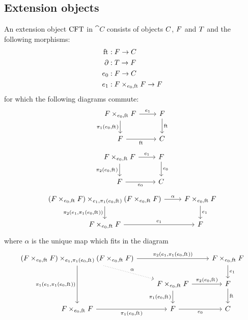 \subsection{Extension objects}
\begin{defn}
An extension object $\mathrm{CFT}$ in $\cat{C}$ consists of objects $\esysc{\stesys}$, $\esysf{\stesys}$ and $\esyst{\stesys}$ and the
following morphisms:
\begin{align*}
\eft &:\stesysf \to \stesysc\\
\ebd &:\stesyst\to \stesysf\\
\ectxext &:\stesysf\to \stesysc\\
\efamext & :\stesysff\to \stesysf
\end{align*}
for which the following diagrams commute:
\begin{equation*}
\begin{tikzcd}
\stesysff 
  \ar{r}{\efamext} 
  \ar{d}[swap]{\pullbackpr{1}{\ectxext}{\eft}} 
  & 
\stesysf 
  \ar{d}{\eft}
  \\
\stesysf
  \ar{r}[swap]{\eft} 
  & 
\stesysc
\end{tikzcd}
\end{equation*}
\begin{equation*}
\begin{tikzcd}
\stesysff 
  \ar{d}[swap]{\pullbackpr{2}{\ectxext}{\eft}} 
  \ar{r}{\efamext} 
  & 
\stesysf 
  \ar{d}{\ectxext}
  \\
\stesysf 
  \ar{r}[swap]{\ectxext} 
  & 
\stesysc
\end{tikzcd}
\end{equation*}
\begin{equation*}
\begin{tikzcd}
\pullback{\stesysff}{\stesysff}{\efamext}{\pullbackpr{1}{\ectxext}{\eft}} 
  \ar{d}[swap]{\pullbackpr{2}{\efamext}{\pullbackpr{1}{\ectxext}{\eft}}}
  \ar{r}{\alpha}
  & 
\stesysff 
  \ar{d}{\efamext} 
  \\
\stesysff 
  \ar{r}{\efamext} 
  &
\stesysf
\end{tikzcd}
\end{equation*}
where $\alpha$ is the unique map which fits in the diagram
\begin{equation*}
\begin{tikzcd}
\pullback{\stesysff}{\stesysff}{\efamext}{\pullbackpr{1}{\ectxext}{\eft}}
  \ar[dotted]{dr}{\alpha}
  \ar{rr}{\pullbackpr{2}{\efamext}{\pullbackpr{1}{\ectxext}{\eft}}}
  \ar{dd}[swap]{\pullbackpr{1}{\efamext}{\pullbackpr{1}{\ectxext}{\eft}}}
  & 
  &
\stesysff
  \ar{d}{\efamext}
  \\
  &
\stesysff
  \ar{d}[swap]{\pullbackpr{1}{\ectxext}{\eft}}
  \ar{r}{\pullbackpr{2}{\ectxext}{\eft}}
  &
\stesysf
  \ar{d}{\eft}
  \\
\stesysff
  \ar{r}[swap]{\pullbackpr{1}{\ectxext}{\eft}}
  &
\stesysf
  \ar{r}[swap]{\ectxext}
  &
\stesysc
\end{tikzcd}
\end{equation*}
\end{defn}

